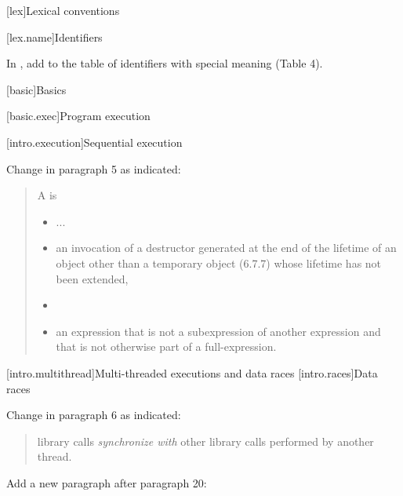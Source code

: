 \setcounter{section}{9}
[lex]{Lexical conventions}


[lex.name]{Identifiers}

In ,
add  to the table of identifiers with special meaning (Table 4).

[basic]{Basics}

\setcounter{section}{8}

[basic.exec]{Program execution}

\setcounter{section}{9}

[intro.execution]{Sequential execution}

Change in  paragraph 5 as indicated:

\begin{quote}
\setcounter{Paras}{4}
\setcounter{Bullets1}{3}
\pnum
A  is

\begin{itemize}
\item
  ...
\item
  an invocation of a destructor generated at the end of the lifetime of
  an object other than a temporary object (6.7.7) whose lifetime has not
  been extended, 
\item
\item
  an expression that is not a subexpression of another expression and
  that is not otherwise part of a full-expression.
\end{itemize}
\end{quote}

[intro.multithread]{Multi-threaded executions and data races}
\setcounter{subsubsection}{1}
[intro.races]{Data races} 

Change in  paragraph 6 as indicated:

\begin{quote}
\setcounter{Paras}{5}
\pnum
{}  library
calls  \emph{synchronize with} other  library calls performed by another thread.
\end{quote}

Add a new paragraph after  paragraph 20:

